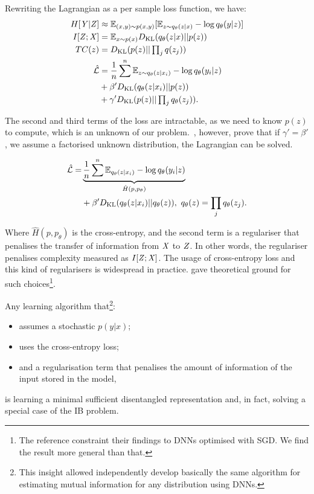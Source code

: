     Rewriting the Lagrangian as a per sample loss function, we have:
    \begin{align}
        H[{\mathit{Y}}|{\mathit{Z}}] & \approx \mathbb{E}_{(x,y) \sim p(x,y)}[\mathbb{E}_{z \sim q_{\theta}(z|x)} - \log q_{\theta}(y|z)] \\
        I[{{\mathit{Z}}};{{\mathit{X}}}] & = \mathbb{E}_{x \sim p(x)} D_{\mathrm{KL}}(q_{\theta}(z|x)||p(z))\\
        TC(z) &= D_{\mathrm{KL}}(p(z)||\textstyle \prod_j q(z_j))\\
        \hat{\mathcal{L}} &= \frac{1}{n} \sum^{n} \mathbb{E}_{z \sim q_{\theta}(z|x_i)} - \log q_{\theta}(y_i|z) \nonumber\\
         &+ \beta' D_{\mathrm{KL}}(q_{\theta}(z|x_i)||p(z)) \nonumber\\
         &+ \gamma' D_{\mathrm{KL}}(p(z)||\textstyle \prod_j q_{\theta}(z_j)).
    \end{align}

    The second and third terms of the loss are intractable, as we need to know $p(z)$ to compute, which is an unknown of our problem.~\cite{achille:2018infodropout}, however, prove that if $\gamma'=\beta'$, \ie we assume a factorised unknown distribution, the Lagrangian can be solved.

    \begin{align}
    \hat{\mathcal{L}} = &\underbrace{\frac{1}{n} \sum^{n} \mathbb{E}_{q_{\theta}(z|x_i)} - \log q_{\theta}(y_i|z)}_{\hat H(p, p_{\theta})}\nonumber\\
    &+ \beta' D_{\mathrm{KL}} (q_{\theta}(z|x_i)||q_{\theta}(z)),~
    q_\theta(z)=\prod_j q_{\theta}(z_j).
    \end{align}

    Where $\hat H(p, p_{\theta})$ is the cross-entropy, and the second term is a regulariser that penalises the transfer of information from ${\mathit{X}}$ to ${\mathit{Z}}$. In other words, the regulariser penalises complexity measured as $I[{{\mathit{Z}}};{{\mathit{X}}}]$. The usage of cross-entropy loss and this kind of regularisers is widespread in practice. \cite{achille:2019phd} gave theoretical ground for such choices\footnote{The reference constraint their findings to \acp{DNN} optimised with \ac{SGD}. We find the result more general than that.}.

    \begin{corollary}
    Any learning algorithm that\footnote{This insight allowed  independently develop basically the same algorithm for estimating mutual information for any distribution using \acp{DNN}.}:
     \begin{itemize}
         \item assumes a stochastic $p(y|x)$;
         \item uses the cross-entropy loss;
         \item and a regularisation term that penalises the amount of information of the input stored in the model,
     \end{itemize} is learning a minimal sufficient disentangled representation and, in fact, solving a special case of the IB problem.
\end{corollary}

